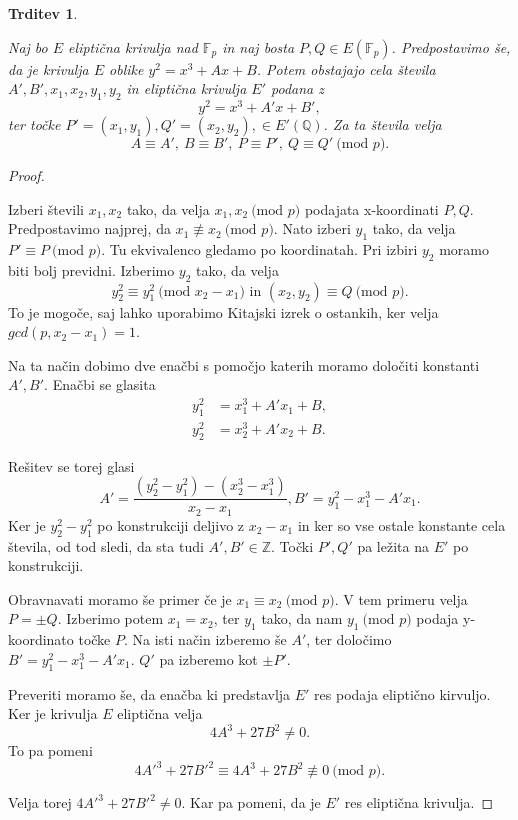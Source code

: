 \documentclass[12pt,a4paper,twoside]{article}
\theoremstyle{definition} %
\theoremstyle{plain} %
\newtheorem{trditev}[definicija]{Trditev}
\numberwithin{equation}{section}  %
\newcommand{\Z}{\mathbb Z}
\newcommand{\Q}{\mathbb Q}
\newcommand{\F}{\mathbb F}
\newcommand{\E}[1]{E({#1})}
\newcommand{\MOD}[1]{\ \text{(mod }{#1}\text{)}}
\begin{document}
\begin{trditev}~

\label{trd:5.6}
Naj bo $E$ eliptična krivulja nad $\F_p$ in naj bosta $P,Q \in \E{\F_p}$. Predpostavimo še, da je krivulja $E$ oblike $y^2=x^3+Ax+B$. Potem obstajajo cela števila
$A',B',x_1,x_2,y_1,y_2$ in eliptična krivulja $E'$ podana z
$$y^2=x^3+A'x+B',$$
ter točke $P'=(x_1,y_1),Q'=(x_2,y_2), \in E'(\Q)$.
Za ta števila velja
$$A\equiv A',\ B \equiv B',\ P \equiv P',\ Q \equiv Q' \MOD{p}.$$

\end{trditev}

\begin{proof}~

Izberi števili $x_1,x_2$ tako, da velja $x_1,x_2 \MOD{p}$ podajata x-koordinati $P,Q$. Predpostavimo najprej, da $x_1 \not \equiv x_2 \MOD{p}$. Nato izberi $y_1$ tako, da velja
$P' \equiv P \MOD{p}$. Tu ekvivalenco gledamo po koordinatah. Pri izbiri $y_2$ moramo biti bolj previdni. Izberimo $y_2$ tako, da velja
$$y_2^2\equiv y_1^2 \MOD{x_2-x_1} \text{ in } (x_2,y_2) \equiv Q \MOD{p}.$$
To je mogoče, saj lahko uporabimo Kitajski izrek o ostankih, ker velja $gcd(p,x_2-x_1) = 1$.

Na ta način dobimo dve enačbi s pomočjo katerih moramo določiti konstanti $A',B'$.
Enačbi se glasita
\begin{align}
y_1^2&{}=x_1^3+A'x_1+B, \nonumber  \\
y_2^2&{}=x_2^3+A'x_2+B. \nonumber
\end{align}

Rešitev se torej glasi
$$A' = \frac{(y_2^2-y_1^2)-(x_2^3-x_1^3)}{x_2-x_1}, B' = y_1^2-x_1^3-A'x_1.$$
Ker je $y_2^2-y_1^2$ po konstrukciji deljivo z $x_2-x_1$ in ker so vse ostale konstante cela števila, od tod sledi, da sta tudi $A',B' \in \Z$. Točki $P',Q'$ pa ležita na $E'$ po konstrukciji.

Obravnavati moramo še primer če je $x_1 \equiv x_2 \MOD{p}$. V tem primeru velja $P = \pm Q$. Izberimo potem $x_1 = x_2$, ter $y_1$ tako, da nam $y_1 \MOD{p}$ podaja y-koordinato točke $P$. Na isti način izberemo še $A'$, ter določimo $B' = y_1^2-x_1^3-A'x_1$. $Q'$ pa izberemo kot $\pm P'$.

Preveriti moramo še, da enačba ki predstavlja $E'$ res podaja eliptično kirvuljo. Ker je krivulja $E$ eliptična velja
$$4A^3+27B^2 \neq 0.$$
To pa pomeni
$$4A'^3+27B'^2 \equiv 4A^3+27B^2 \not \equiv 0 \MOD{p}.$$

Velja torej $4A'^3+27B'^2 \neq 0$. Kar pa pomeni, da je $E'$ res eliptična krivulja.
\end{proof}
\end{document}
